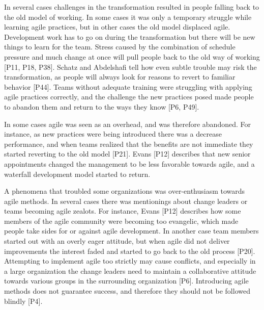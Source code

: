 
In several cases challenges in the transformation resulted in people falling
back to the old model of working. In some cases it was only a temporary struggle
while learning agile practices, but in other cases the old model displaced
agile.
Development work has to go on during the transformation but there will be new
things to learn for the team. Stress caused by the combination of schedule
pressure and much change at once will pull people back to the old way of working
[P11, P18, P38].
Schatz and Abdelshafi tell how even subtle trouble may risk the transformation,
as people will always look for reasons to revert to familiar behavior [P44].
Teams without adequate training were struggling with applying agile practices
correctly, and the challenge the new practices posed made people to abandon them
and return to the ways they know [P6, P49].

In some cases agile was seen as an overhead, and was therefore abandoned. For
instance, as new practices were being introduced there was a decrease
performance, and when teams realized that the benefits are not immediate they
started reverting to the old model [P21].
Evans [P12] describes that new senior appointments changed the management to be
less favorable towards agile, and a waterfall development model started to
return.


A phenomena that troubled some organizations was over-enthusiasm towards agile
methods. In several cases there was mentionings about change leaders or teams
becoming agile zealots. For instance, Evans [P12] describes how some members of
the agile community were becoming too evangelic, which made people take sides
for or against agile development. In another case team members started out with
an overly eager attitude, but when agile did not deliver improvements the
interest faded and started to go back to the old process [P20]. Attempting to
implement agile too strictly may cause conflicts, and especially in a large
organization the change leaders need to maintain a collaborative attitude
towards various groups in the surrounding organization [P6]. Introducing agile
methods does not guarantee success, and therefore they should not be followed
blindly [P4].



